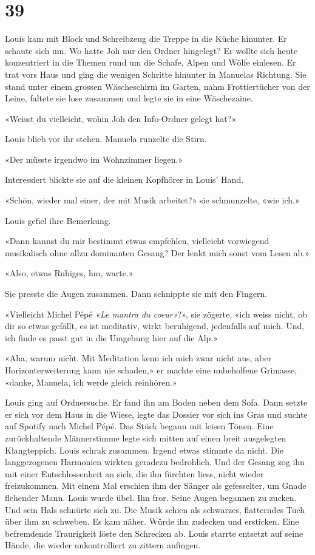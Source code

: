 \chapter{39}



Louis kam mit Block und Schreibzeug die Treppe in die
Küche hinunter. Er schaute sich um. Wo hatte Joh nur den Ordner
hingelegt? Er wollte sich heute konzentriert in die Themen rund um
die Schafe, Alpen und Wölfe einlesen.
Er trat vors Haus und ging die wenigen Schritte hinunter in Manuelas
Richtung. Sie stand unter einem grossen Wäscheschirm im Garten, nahm
Frottiertücher von der Leine, faltete sie lose zusammen und legte sie in
eine Wäschezaine.

«Weisst du vielleicht, wohin Joh den Info-Ordner gelegt hat?»

Louis blieb vor ihr stehen. Manuela runzelte die Stirn.

«Der müsste irgendwo im Wohnzimmer liegen.»

Interessiert blickte sie auf die kleinen Kopfhörer in Louis’ Hand.

«Schön, wieder mal einer, der mit Musik arbeitet?» sie schmunzelte, «wie
ich.»

Louis gefiel ihre Bemerkung.

«Dann kannst du mir bestimmt etwas empfehlen, vielleicht vorwiegend
musikalisch ohne allzu dominanten Gesang? Der lenkt mich sonst vom Lesen
ab.»

«Also, etwas Ruhiges, hm, warte.»

Sie presste die Augen zusammen. Dann schnippte sie mit den Fingern.

«Vielleicht Michel Pépé \emph{«Le mantra du coeur»}?», sie zögerte,
«ich weiss nicht, ob dir so etwas gefällt, es ist meditativ, wirkt
beruhigend, jedenfalls auf mich. Und, ich finde es passt gut in
die Umgebung hier auf die Alp.»

«Aha, warum nicht. Mit Meditation kenn ich mich zwar nicht aus, aber
Horizonterweiterung kann nie schaden,» er machte eine unbeholfene
Grimasse, «danke, Manuela, ich werde gleich reinhören.»

Louis ging auf Ordnersuche. Er fand ihn am Boden neben dem Sofa. Dann setzte er sich
vor dem Haus in die Wiese, legte das Dossier vor sich ins Gras und
suchte auf Spotify nach Michel Pépé.
Das Stück begann mit leisen Tönen. Eine zurückhaltende Männerstimme
legte sich mitten auf einen breit ausgelegten Klangteppich. Louis schrak zusammen. Irgend
etwas stimmte da nicht. Die langgezogenen Harmonien wirkten geradezu
bedrohlich. Und der Gesang zog ihn mit einer Entschlossenheit an sich,
die ihn fürchten liess, nicht wieder freizukommen. Mit einem Mal
erschien ihm der Sänger als gefesselter, um Gnade flehender Mann. Louis
wurde übel. Ihn fror. Seine Augen begannen zu zucken. Und sein Hals
schnürte sich zu. Die Musik schien als schwarzes, flatterndes Tuch über
ihm zu schweben. Es kam näher. Würde ihn zudecken und ersticken.
Eine befremdende Traurigkeit löste den Schrecken ab. Louis starrte
entsetzt auf seine Hände, die wieder unkontrolliert zu zittern anfingen.

